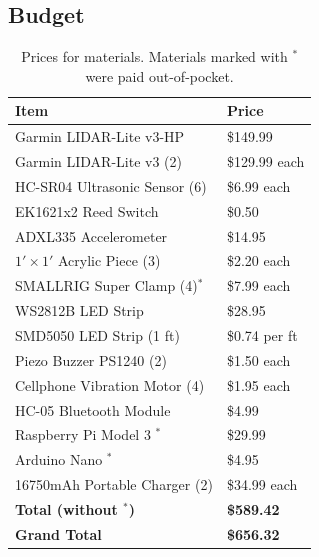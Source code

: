 \documentclass[journal]{IEEEtran}
\begin{document}
\subsection{Budget}
\begin{table}[H]
    \centering
    \begin{tabularx}{0.4\textwidth}{ll}
        \toprule
         \textbf{Item}  & \textbf{Price}  \\
         \midrule
         Garmin LIDAR-Lite v3-HP        & \$149.99\\
         Garmin LIDAR-Lite v3 (2)       & \$129.99 each\\
         HC-SR04 Ultrasonic Sensor (6)  & \$6.99 each\\
         EK1621x2 Reed Switch           & \$0.50\\
         ADXL335 Accelerometer          & \$14.95\\
         $1' \times 1'$ Acrylic Piece (3) & \$2.20 each\\ 
         SMALLRIG Super Clamp (4)$^\ast$       & \$7.99 each\\
         
         WS2812B LED Strip              & \$28.95\\
         SMD5050 LED Strip (1 ft)       & \$0.74 per ft\\
         Piezo Buzzer PS1240 (2)        & \$1.50 each\\
         Cellphone Vibration Motor (4)  & \$1.95 each\\
         HC-05 Bluetooth Module         & \$4.99\\
         
         Raspberry Pi Model 3 $^\ast$          & \$29.99\\
         Arduino Nano $^\ast$                  & \$4.95\\
         
         16750mAh Portable Charger (2)     & \$34.99 each\\
         \midrule
         \textbf{Total (without $^\ast$)} & \textbf{\$589.42}\\
         \textbf{Grand Total} & \textbf{\$656.32}\\
         \toprule
    \end{tabularx}
    \caption{Prices for materials. Materials marked with $^\ast$ were paid out-of-pocket.}
    \label{tab:prices}
\end{table}
\end{document}
